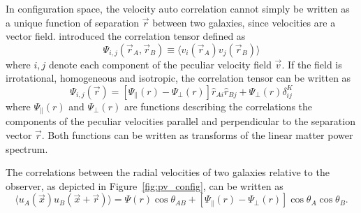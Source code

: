     In configuration space, the velocity auto correlation cannot simply be written as 
    a unique function of separation $\vec{r}$ between two galaxies, since velocities are 
    a vector field. \cite{gorskiPatternPerturbationsHubble1988} introduced the 
    correlation tensor defined as 
    \begin{equation}
        \Psi_{i, j}(\vec{r}_A, \vec{r}_B) \equiv \langle v_i(\vec{r}_A) v_j(\vec{r}_B) \rangle 
        \label{eq:correlation_tensor}
    \end{equation}
    where $i, j$ denote each component of the peculiar velocity field $\vec{v}$. 
    If the field is irrotational, homogeneous and isotropic, the correlation tensor 
    can be written as 
    \begin{equation}
        \Psi_{i, j}(\vec{r}) = 
        \left[ \Psi_\parallel(r) - \Psi_\perp(r) \right] \hat{r}_{Ai} \hat{r}_{Bj} 
        + \Psi_\perp(r) \delta^K_{ij}
    \end{equation}
    where $\Psi_\parallel(r)$ and $\Psi_\perp(r)$ are functions describing the correlations 
    the components of the peculiar velocities parallel and perpendicular to the 
    separation vector $\vec{r}$. Both functions can be written as transforms of the linear 
    matter power spectrum. 

    The correlations between the radial velocities of two galaxies
    relative to the observer, as depicted in 
    Figure~\ref{fig:pv_config}, can be written as 
    \begin{equation}
        \langle u_A(\vec{x})u_B(\vec{x}+\vec{r}) \rangle = 
        \Psi(r) \cos \theta_{AB} 
        + \left[ \Psi_\parallel(r) - \Psi_\perp(r) \right] \cos \theta_A \cos \theta_B. 
    \end{equation}
    
    

